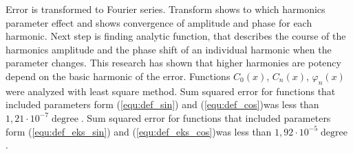 \documentclass[a4paper]{article}
\begin{document}
Error is transformed to Fourier series. Transform shows to which harmonics parameter effect and shows convergence of amplitude and phase for each harmonic. Next step is finding analytic function, that describes the course of the harmonics amplitude and the phase shift of an individual harmonic when the parameter changes. This research has shown that higher harmonies are potency depend on the basic harmonic of the error. Functions $C_0(x)$, $C_n(x)$, $\varphi_n(x)$ were analyzed with least square method. Sum squared error for functions that included parameters form (\ref{equ:def_sin}) and (\ref{equ:def_cos})was less than $1,21 \cdot 10^{-7}\operatorname{degree}$. 
Sum squared error for functions that included parameters form (\ref{equ:def_eks_sin}) and (\ref{equ:def_eks_cos})was less than $1,92 \cdot 10^{-5}\operatorname{degree}$. 
\end{document}
